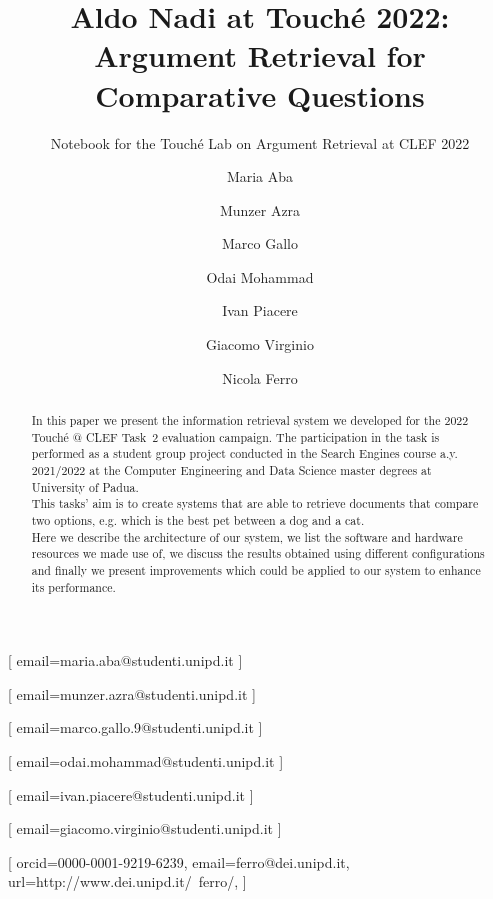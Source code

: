 \documentclass{ceurart}
\begin{document}


\title{Aldo Nadi at Touch{\'e} 2022: Argument Retrieval for Comparative Questions}

\subtitle{Notebook for the Touch{\'e} Lab on Argument Retrieval at CLEF 2022}

\author[1]{Maria Aba}[%
email=maria.aba@studenti.unipd.it
]

\author[1]{Munzer Azra}[%
email=munzer.azra@studenti.unipd.it
]

\author[1]{Marco Gallo}[%
email=marco.gallo.9@studenti.unipd.it
]

\author[1]{Odai Mohammad}[%
email=odai.mohammad@studenti.unipd.it
]

\author[1]{Ivan Piacere}[%
email=ivan.piacere@studenti.unipd.it
]

\author[1]{Giacomo Virginio}[%
email=giacomo.virginio@studenti.unipd.it
]

\author[1]{Nicola Ferro}[%
orcid=0000-0001-9219-6239,
email=ferro@dei.unipd.it,
url=http://www.dei.unipd.it/~ferro/,
]

\address[1]{University of Padua, Italy}


\begin{abstract}
	In this paper we present the information retrieval system we developed for the 2022 Touché @ CLEF Task~2 evaluation campaign. The participation in the task is performed as a student group project conducted in the Search Engines course a.y. 2021/2022 at the Computer Engineering and Data Science master degrees at University of Padua.\\
	This tasks' aim is to create systems that are able to retrieve documents that compare two options, e.g. which is the best pet between a dog and a cat.\\
	Here we describe the architecture of our system, we list the software and hardware resources we made use of, we discuss the results obtained using different configurations and finally we present improvements which could be applied to our system to enhance its performance.
\end{abstract}
\end{document}
